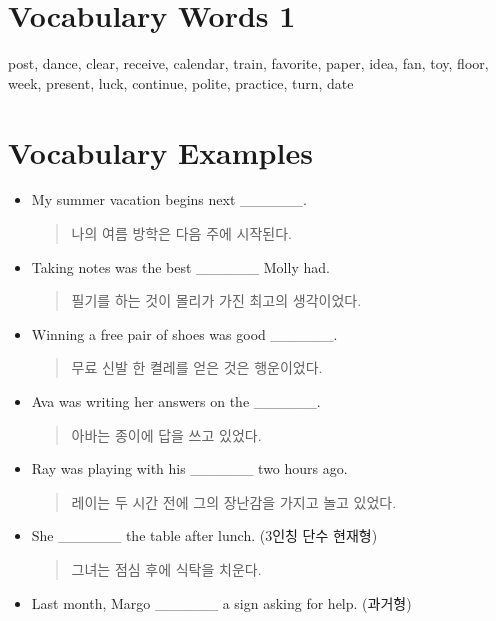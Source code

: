 \documentclass{article}
\begin{document}
\renewcommand{\familydefault}{\sfdefault}
\onehalfspacing
\fontsize{12pt}{14pt}\selectfont

\section*{Vocabulary Words 1}
\begin{addmargin}[1em]{1em}
post, dance, clear, receive, calendar, train, favorite, paper, idea, fan, toy, floor, week, present, luck, continue, polite, practice, turn, date
\end{addmargin}

\section*{Vocabulary Examples}
\begin{addmargin}[1em]{1em}
\begin{itemize}
    \item My summer vacation begins next \_\_\_\_\_\_.
    \begin{quote}
    나의 여름 방학은 다음 주에 시작된다.
    \end{quote}
    \item Taking notes was the best \_\_\_\_\_\_ Molly had.
    \begin{quote}
    필기를 하는 것이 몰리가 가진 최고의 생각이었다.
    \end{quote}
    \item Winning a free pair of shoes was good \_\_\_\_\_\_.
    \begin{quote}
    무료 신발 한 켤레를 얻은 것은 행운이었다.
    \end{quote}
    \item Ava was writing her answers on the \_\_\_\_\_\_.
    \begin{quote}
    아바는 종이에 답을 쓰고 있었다.
    \end{quote}
    \item Ray was playing with his \_\_\_\_\_\_ two hours ago.
    \begin{quote}
    레이는 두 시간 전에 그의 장난감을 가지고 놀고 있었다.
    \end{quote}
    \item She \_\_\_\_\_\_ the table after lunch. (3인칭 단수 현재형)
    \begin{quote}
    그녀는 점심 후에 식탁을 치운다.
    \end{quote}
    \item Last month, Margo \_\_\_\_\_\_ a sign asking for help. (과거형)

\end{itemize}
\end{addmargin}
\end{document}
